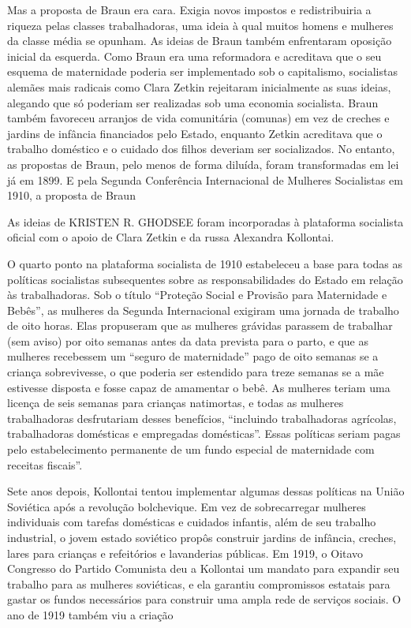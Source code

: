 Mas a proposta de Braun era cara. Exigia novos impostos e redistribuiria a riqueza pelas classes trabalhadoras, uma ideia à qual muitos homens e mulheres da classe média se opunham. As ideias de Braun também enfrentaram oposição inicial da esquerda. Como Braun era uma reformadora e acreditava que o seu esquema de maternidade poderia ser implementado sob o capitalismo, socialistas alemães mais radicais como Clara Zetkin rejeitaram inicialmente as suas ideias, alegando que só poderiam ser realizadas sob uma economia socialista. Braun também favoreceu arranjos de vida comunitária (comunas) em vez de creches e jardins de infância financiados pelo Estado, enquanto Zetkin acreditava que o trabalho doméstico e o cuidado dos filhos deveriam ser socializados. No entanto, as propostas de Braun, pelo menos de forma diluída, foram transformadas em lei já em 1899. E pela Segunda Conferência Internacional de Mulheres Socialistas em 1910, a proposta de Braun
 \par 
As ideias de KRISTEN R. GHODSEE foram incorporadas à plataforma socialista oficial com o apoio de Clara Zetkin e da russa Alexandra Kollontai.
 \par 
O quarto ponto na plataforma socialista de 1910 estabeleceu a base para todas as políticas socialistas subsequentes sobre as responsabilidades do Estado em relação às trabalhadoras. Sob o título “Proteção Social e Provisão para Maternidade e Bebês”, as mulheres da Segunda Internacional exigiram uma jornada de trabalho de oito horas. Elas propuseram que as mulheres grávidas parassem de trabalhar (sem aviso) por oito semanas antes da data prevista para o parto, e que as mulheres recebessem um “seguro de maternidade” pago de oito semanas se a criança sobrevivesse, o que poderia ser estendido para treze semanas se a mãe estivesse disposta e fosse capaz de amamentar o bebê. As mulheres teriam uma licença de seis semanas para crianças natimortas, e todas as mulheres trabalhadoras desfrutariam desses benefícios, “incluindo trabalhadoras agrícolas, trabalhadoras domésticas e empregadas domésticas”. Essas políticas seriam pagas pelo estabelecimento permanente de um fundo especial de maternidade com receitas fiscais”.
 \par 
Sete anos depois, Kollontai tentou implementar algumas dessas políticas na União Soviética após a revolução bolchevique. Em vez de sobrecarregar mulheres individuais com tarefas domésticas e cuidados infantis, além de seu trabalho industrial, o jovem estado soviético propôs construir jardins de infância, creches, lares para crianças e refeitórios e lavanderias públicas. Em 1919, o Oitavo Congresso do Partido Comunista deu a Kollontai um mandato para expandir seu trabalho para as mulheres soviéticas, e ela garantiu compromissos estatais para gastar os fundos necessários para construir uma ampla rede de serviços sociais. O ano de 1919 também viu a criação
